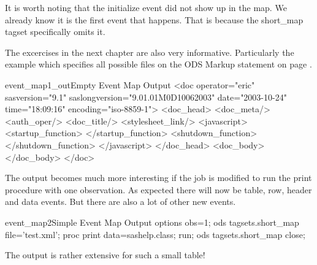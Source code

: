 It is worth noting that the initialize event did not show up in the map.
We already know it is the first event that happens.  That is because the
short\_map tagset specifically omits it.  

The excercises in the next chapter are also very informative.  Particularly
the example which specifies all possible files on the ODS Markup statement
on page \pageref{allmaps}.

\begin{fvoutput}{event_map1_out}{Empty Event Map Output}
<doc operator="eric" sasversion="9.1" 
     saslongversion="9.01.01M0D10062003" 
     date="2003-10-24" time="18:09:16" encoding="iso-8859-1">
  <doc_head>
    <doc_meta/>
    <auth_oper/>
    <doc_title/>
    <stylesheet_link/>
    <javascript>
      <startup_function>
      </startup_function>
      <shutdown_function>
      </shutdown_function>
    </javascript>
  </doc_head>
  <doc_body>
  </doc_body>
</doc>
\end{fvoutput}

The output becomes much more interesting if the job is modified 
to run the print procedure with one observation.  As expected
there will now be table, row, header and data events.  But there
are also a lot of other new events.

\begin{fvcode}{event_map2}{Simple Event Map Output}
options obs=1;
ods tagsets.short_map file='test.xml';
proc print data=sashelp.class; run;
ods tagsets.short_map close;
\end{fvcode}

The output is rather extensive for such a small table!

